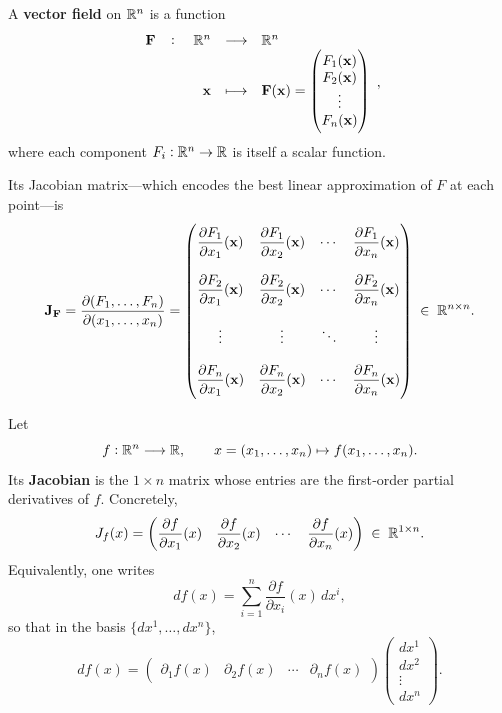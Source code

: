 \documentclass[11pt,openany]{article}
\renewcommand{\vec}[1]{\mathbf{#1}}
\renewcommand{\emph}[1]{\textbf{#1}}
\begin{document}
\newpage
\begin{definition*}
A \textbf{vector field} on \(\mathbb{R}^n\) is a function \[
\fullfunction{\vec{F}}{\R^n}{\R^n}{\vec{x}}{
\vec{F}(\vec{x})=
\begin{pmatrix}
	F_1(\vec{x})\\
	F_2(\vec{x})\\
	\vdots\\
	F_n(\vec{x})
\end{pmatrix}
},
\] where each component \(F_i:\mathbb{R}^n\to\mathbb{R}\) is itself a scalar function.
\end{definition*}
\vfill
\begin{remark*}
Its Jacobian matrix—which encodes the best linear approximation of \(F\) at each point—is
\[
\vec{J}_{\vec{F}}
=\frac{\partial(F_1,\dots,F_n)}{\partial(x_1,\dots,x_n)}
=\begin{pmatrix}
	\displaystyle \frac{\partial F_1}{\partial x_1}(\vec{x})
	&\displaystyle \frac{\partial F_1}{\partial x_2}(\vec{x})
	&\cdots
	&\displaystyle \frac{\partial F_1}{\partial x_n}(\vec{x})\\ \\
	\displaystyle \frac{\partial F_2}{\partial x_1}(\vec{x})
	&\displaystyle \frac{\partial F_2}{\partial x_2}(\vec{x})
	&\cdots
	&\displaystyle \frac{\partial F_2}{\partial x_n}(\vec{x})\\ \\
	\vdots & \vdots & \ddots & \vdots\\ \\
	\displaystyle \frac{\partial F_n}{\partial x_1}(\vec{x})
	&\displaystyle \frac{\partial F_n}{\partial x_2}(\vec{x})
	&\cdots
	&\displaystyle \frac{\partial F_n}{\partial x_n}(\vec{x})
\end{pmatrix}
\;\in\;\R^{n\times n}.
\]
\end{remark*}
Let
\[
f:\mathbb{R}^n\longrightarrow\mathbb{R},
\qquad
x=(x_1,\dots,x_n)\mapsto f(x_1,\dots,x_n).
\]
Its \emph{Jacobian} is the \(1\times n\) matrix whose entries are the first‐order partial derivatives of \(f\).  Concretely,
\[
J_f(x)
=\begin{pmatrix}
	\dfrac{\partial f}{\partial x_1}(x)
	&
	\dfrac{\partial f}{\partial x_2}(x)
	&
	\cdots
	&
	\dfrac{\partial f}{\partial x_n}(x)
\end{pmatrix}
\;\in\;\mathbb{R}^{1\times n}.
\]
Equivalently, one writes
\[
df(x)
=\sum_{i=1}^n \frac{\partial f}{\partial x_i}(x)\,dx^i,
\]
so that in the basis \(\{dx^1,\dots,dx^n\}\),
\[
df(x)
=\begin{pmatrix}
	\partial_{1}f(x) & \partial_{2}f(x) & \cdots & \partial_{n}f(x)
\end{pmatrix}
\begin{pmatrix}dx^1\\dx^2\\\vdots\\dx^n\end{pmatrix}.
\]
\end{document}
